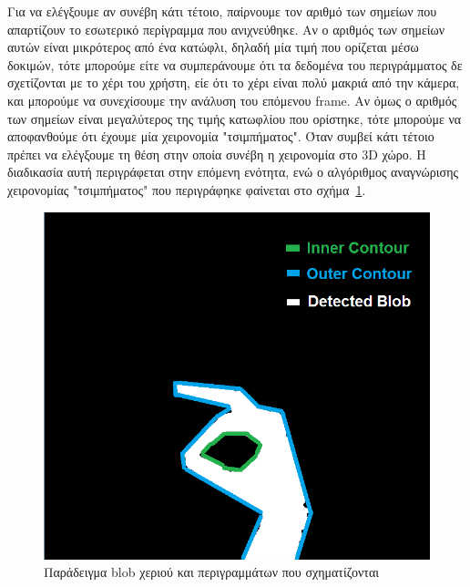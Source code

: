 Για να ελέγξουμε αν συνέβη κάτι τέτοιο, παίρνουμε τον αριθμό των σημείων που απαρτίζουν το εσωτερικό περίγραμμα που ανιχνεύθηκε. Αν ο αριθμός των σημείων αυτών είναι μικρότερος από ένα κατώφλι, δηλαδή μία τιμή που ορίζεται μέσω δοκιμών, τότε μπορούμε είτε να συμπεράνουμε ότι τα δεδομένα του περιγράμματος δε σχετίζονται με το χέρι του χρήστη, είε ότι το χέρι είναι πολύ μακριά από την κάμερα, και μπορούμε να συνεχίσουμε την ανάλυση του επόμενου frame. Αν όμως ο αριθμός των σημείων είναι μεγαλύτερος της τιμής κατωφλίου που ορίστηκε, τότε μπορούμε να αποφανθούμε ότι έχουμε μία χειρονομία "τσιμπήματος". Όταν συμβεί κάτι τέτοιο πρέπει να ελέγξουμε τη θέση στην οποία συνέβη η χειρονομία στο 3D χώρο. Η διαδικασία αυτή περιγράφεται στην επόμενη ενότητα, ενώ ο αλγόριθμος αναγνώρισης χειρονομίας "τσιμπήματος" που περιγράφηκε φαίνεται στο σχήμα~\ref{fig:gesture_rec}.



\begin{figure}[H]
    \centering
    \includegraphics[scale=0.7, angle=0]{Files/Figures/2.png}
    \caption[Παράδειγμα blob χεριού και περιγραμμάτων που σχηματίζονται]{Παράδειγμα blob χεριού και περιγραμμάτων που σχηματίζονται}
    \label{fig:gesture_rec}
\end{figure}



